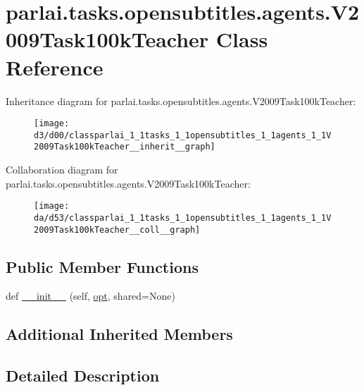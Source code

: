 \hypertarget{classparlai_1_1tasks_1_1opensubtitles_1_1agents_1_1V2009Task100kTeacher}{}\section{parlai.\+tasks.\+opensubtitles.\+agents.\+V2009\+Task100k\+Teacher Class Reference}
\label{classparlai_1_1tasks_1_1opensubtitles_1_1agents_1_1V2009Task100kTeacher}


Inheritance diagram for parlai.\+tasks.\+opensubtitles.\+agents.\+V2009\+Task100k\+Teacher\+:
\nopagebreak
\begin{figure}[H]
\begin{center}
\leavevmode
\texttt{[image: d3/d00/classparlai\_1\_1tasks\_1\_1opensubtitles\_1\_1agents\_1\_1V2009Task100kTeacher\_\_inherit\_\_graph]}
\end{center}
\end{figure}


Collaboration diagram for parlai.\+tasks.\+opensubtitles.\+agents.\+V2009\+Task100k\+Teacher\+:
\nopagebreak
\begin{figure}[H]
\begin{center}
\leavevmode
\texttt{[image: da/d53/classparlai\_1\_1tasks\_1\_1opensubtitles\_1\_1agents\_1\_1V2009Task100kTeacher\_\_coll\_\_graph]}
\end{center}
\end{figure}
\subsection*{Public Member Functions}
\begin{DoxyCompactItemize}
\item 
def \hyperlink{classparlai_1_1tasks_1_1opensubtitles_1_1agents_1_1V2009Task100kTeacher_a99fe8e12c849b677378eb7ed8c18f344}{\+\_\+\+\_\+init\+\_\+\+\_\+} (self, \hyperlink{classparlai_1_1core_1_1teachers_1_1FbDialogTeacher_af7a9ec497b9cd0292d7b8fa220da7c28}{opt}, shared=None)
\end{DoxyCompactItemize}
\subsection*{Additional Inherited Members}


\subsection{Detailed Description}


